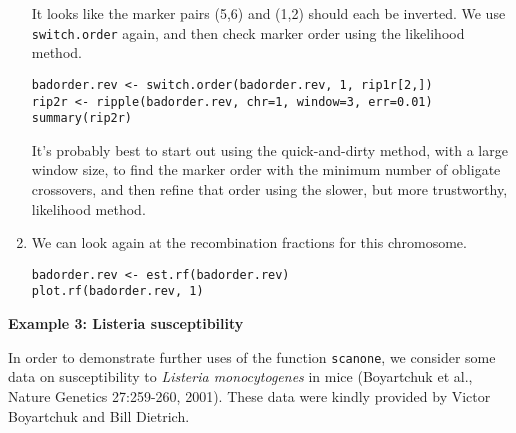 \documentclass[10pt,letterpaper]{article}
\newcommand{\usercolor}{\color [named]{BlueViolet}}
\begin{document}
\begin{enumerate}
It looks like the marker pairs (5,6) and (1,2) should each be
inverted.  We use \verb-switch.order- again, and then check marker
order using the likelihood method.  

\usercolor
\verb|badorder.rev <- switch.order(badorder.rev, 1, rip1r[2,])|  \\
\verb|rip2r <- ripple(badorder.rev, chr=1, window=3, err=0.01)| \\
\verb|summary(rip2r)| 
\normalcolor

It's probably best to start out using the quick-and-dirty method, with
a large window size, to find the marker order with the minimum number
of obligate crossovers, and then refine that order using the slower,
but more trustworthy, likelihood method.

\item We can look again at the recombination fractions for this
chromosome.

\usercolor
\verb|badorder.rev <- est.rf(badorder.rev)| \\
\verb|plot.rf(badorder.rev, 1)| 
\normalcolor

\end{enumerate}




\vspace{12pt}
\noindent \textbf{Example 3: Listeria susceptibility} \vspace{6pt}
\nopagebreak

\noindent In order to demonstrate further uses of the function
\verb-scanone-, we consider some data on susceptibility to
\emph{Listeria monocytogenes\/} in mice (Boyartchuk et al., Nature
Genetics 27:259-260, 2001).  These data were kindly provided by Victor
Boyartchuk and Bill Dietrich.
\end{document}
